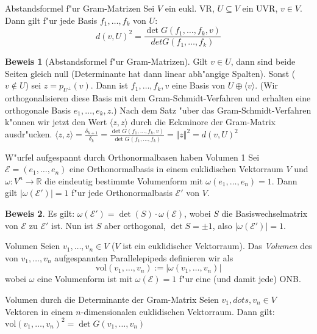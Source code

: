 \documentclass[oneside,fontsize=11pt,paper=a4,BCOR=0mm,DIV=12,automark,headsepline]{scrbook}
\theoremstyle{remark}
\theoremstyle{definition}
\theoremstyle{definition}
\newtheorem*{prof}{Beweis}
\theoremstyle{remark}
\begin{document}
\begin{satz}{Abstandsformel f"ur Gram-Matrizen}{}
  Sei $V$ ein eukl. VR, $U\subseteq V$ ein UVR, $v\in V$. Dann gilt f"ur jede
  Basis $f_1, \ldots, f_k$ von $U$: \[d(v,U)^2 = \frac{\det G(f_1, \ldots, f_k, v)}{det G(f_1, \ldots, f_k)}\]
\end{satz}

\begin{prof}[Abstandsformel f"ur Gram-Matrizen]
  Gilt \(v\in U\), dann sind beide Seiten gleich null (Determinante hat dann linear abh"angige Spalten). Sonst (\(v \not\in U\)) sei \(z = p_{U^\perp}(v)\). Dann ist \(f_1, \dots, f_k, v\) eine Basis von \(U\oplus \langle v\rangle\). (Wir orthogonalisieren diese Basis mit dem Gram-Schmidt-Verfahren und erhalten eine orthogonale Basis \(e_1, \dots, e_k, z\).) Nach dem Satz "uber das Gram-Schmidt-Verfahren k"onnen wir jetzt den Wert \(\langle z, z\rangle\) durch die Eckminore der Gram-Matrix ausdr"ucken. \(\langle z,z\rangle = \frac{\delta_{k+1}}{\delta_k} = \frac{\det G(f_1,\dots, f_k, v)}{\det G(f_1, \dots, f_k)} = \Vert z\Vert^2 = d(v, U)^2\)
\end{prof}
\begin{satz}{W"urfel aufgespannt durch Orthonormalbasen haben Volumen 1}{}
  Sei \(\mathcal{E} = (e_1,\dots,e_n)\) eine Orthonormalbasis in einem euklidischen Vektorraum \(V\) und \(\omega : V^n\to\mathbb{R}\) die eindeutig bestimmte Volumenform mit \(\omega (e_1,\dots,e_n) = 1\). Dann gilt \(|\omega (\mathcal{E'})| = 1\) f"ur jede Orthonormalbasis \(\mathcal{E}'\) von \(V\).
\end{satz}
\begin{prof}
  Es gilt: \(\omega (\mathcal{E}') = \det (S)\cdot\omega (\mathcal{E})\), wobei \(S\) die Basiswechselmatrix von \(\mathcal{E}\) zu \(\mathcal{E}'\) ist. Nun ist \(S\) aber orthogonal, \(\det S = \pm 1\), also \(|\omega (\mathcal{E}')| = 1\).
\end{prof}
\begin{definition}{Volumen}{}
  Seien \(v_1,\dots, v_n\in V\) (\(V\) ist ein euklidischer Vektorraum). Das \emph{Volumen} des von \(v_1,\dots, v_n\) aufgespannten Parallelepipeds definieren wir als \[\text{vol}(v_1,\dots,v_n) := |\omega (v_1,\dots,v_n)|\] wobei \(\omega\) eine Volumenform ist mit \(\omega (\mathcal{E}) = 1\) f"ur eine (und damit jede) ONB.
\end{definition}
\begin{satz}{Volumen durch die Determinante der Gram-Matrix}{}
  Seien \(v_1,dots,v_n\in V\) Vektoren in einem \(n\)-dimensionalen euklidischen Vektorraum. Dann gilt: \(\text{vol}(v_1,\dots,v_n)^2 = \det G(v_1,\dots,v_n)\)
\end{satz}
\end{document}
